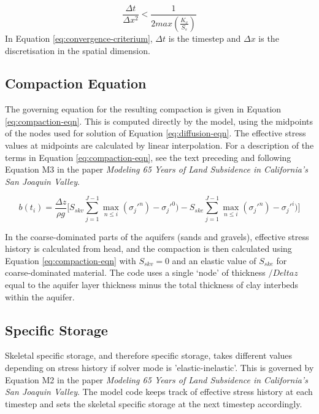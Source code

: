 \documentclass{article}
\begin{document}
\begin{equation}
\frac{\Delta t}{\Delta x ^2} < \frac{1}{2 max(\frac{K_v}{S_s})}
\label{eq:convergence-criterium}
\end{equation}
In Equation \ref{eq:convergence-criterium}, $\Delta t$ is the timestep and $\Delta x$ is the discretisation in the spatial dimension.

\subsection{Compaction Equation}

The governing equation for the resulting compaction is given in Equation \ref{eq:compaction-eqn}. This is computed directly by the model, using the midpoints of the nodes used for solution of Equation \ref{eq:diffusion-eqn}. The effective stress values at midpoints are calculated by linear interpolation. For a description of the terms in Equation \ref{eq:compaction-eqn}, see the text preceding and following Equation M3 in the paper \textit{Modeling 65 Years of Land Subsidence in California’s San Joaquin Valley}.

\begin{equation}
\label{eq:compaction-eqn}
b(t_i) = \frac{\Delta z}{\rho g} \Big[ S_{skv} \sum\limits_{j=1}^{J-1} \max_{n \leq i} (\sigma_j'^n) - \sigma_j'^0) - S_{ske} \sum\limits_{j=1}^{J-1} \max_{n \leq i} (\sigma_j'^n) - \sigma_j'^i) \Big]
\end{equation}

In the coarse-dominated parts of the aquifers (sands and gravels), effective stress history is calculated from head, and the compaction is then calculated using Equation  \ref{eq:compaction-eqn} with $S_{skv} = 0$ and an elastic value of $S_{ske}$ for coarse-dominated material. The code uses a single ‘node’ of thickness $/Delta z$ equal to the aquifer layer thickness minus the total thickness of clay interbeds within the aquifer.

\subsection{Specific Storage}

Skeletal specific storage, and therefore specific storage, takes different values depending on stress history if solver mode is 'elastic-inelastic'. This is governed by Equation M2 in the paper \textit{Modeling 65 Years of Land Subsidence in California’s San Joaquin Valley}. The model code keeps track of effective stress history at each timestep and sets the skeletal specific storage at the next timestep accordingly.
\end{document}
